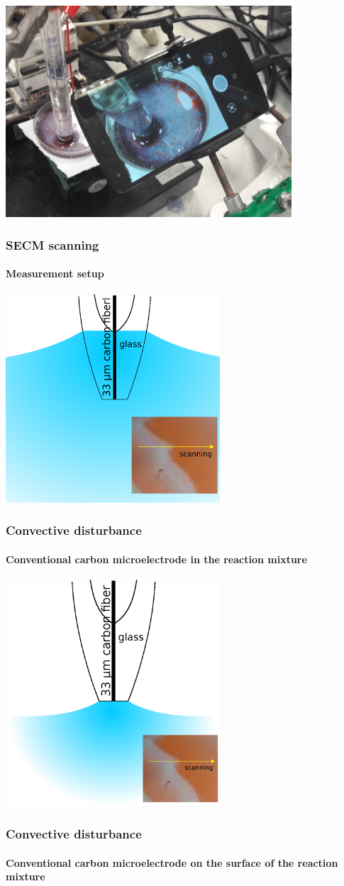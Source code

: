 \documentclass{beamer}
\begin{document}
\begin{frame}
	\centering
	\includegraphics[width=0.8\textwidth]{setup_photo.jpg}
	\frametitle{SECM scanning}
	\framesubtitle{Measurement setup}
\end{frame}

\begin{frame}
	\centering
	\includegraphics[width=0.6\textwidth]{szigeteles1.eps}
	\frametitle{Convective disturbance}
	\framesubtitle{Conventional carbon microelectrode in the reaction mixture}
\end{frame}

\begin{frame}
	\centering
	\includegraphics[width=0.6\textwidth]{szigeteles2.eps}
	\frametitle{Convective disturbance}
	\framesubtitle{Conventional carbon microelectrode on the surface of the reaction mixture}
\end{frame}
\end{document}
